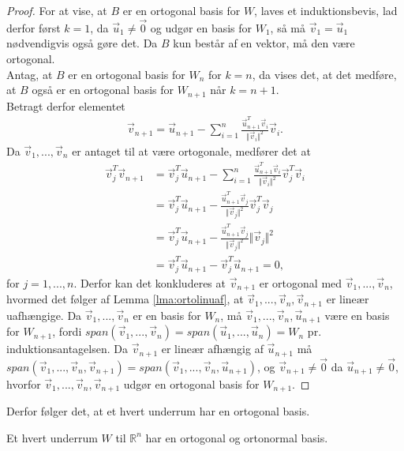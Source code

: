 \begin{proof}
For at  vise, at $B$ er en ortogonal basis for $W$, laves et induktionsbevis, lad derfor først $k= 1$, da $\vec{u}_1\neq \vec{0}$ og udgør en basis for $W_1$, så må $\vec{v}_1 = \vec{u}_1$ nødvendigvis også gøre det.
Da $B$ kun består af en vektor, må den være ortogonal.
\\Antag, at $B$ er en ortogonal basis for $W_n$ for $k=n$, da vises det, at det medføre, at $B$ også er en ortogonal basis for  $W_{n+1}$ når $k = n+1$.
\\Betragt derfor elementet 
\begin{align*}
\vec{v}_{n+1} = \vec{u}_{n+1} - \sum_{i=1}^n \frac{\vec{u}_{n+1}^T\vec{v}_i}{\Vert\vec{v}_i\Vert^2}\vec{v}_i.
\end{align*}
Da $\vec{v}_1,...,\vec{v}_n$ er antaget til at være ortogonale, medfører det at
\begin{align*}
\vec{v}_j^T\vec{v}_{n+1} &= \vec{v}_j^T\vec{u}_{n+1} - \sum_{i=1}^n \frac{\vec{u}_{n+1}^T\vec{v}_i}{\Vert\vec{v}_i\Vert^2}\vec{v}_j^T\vec{v}_i
\\ &= \vec{v}_j^T\vec{u}_{n+1} - \frac{\vec{u}_{n+1}^T\vec{v}_j}{\Vert\vec{v}_j\Vert^2}\vec{v}_j^T\vec{v}_j
\\ & = \vec{v}_j^T\vec{u}_{n+1} -  \frac{\vec{u}_{n+1}^T\vec{v}_j}{\Vert\vec{v}_j\Vert^2}\Vert\vec{v}_j\Vert^2
\\ & =\vec{v}_j^T\vec{u}_{n+1} - \vec{v}_j^T\vec{u}_{n+1} = 0 , 
\end{align*}
for $j = 1,...,n$. 
Derfor kan det konkluderes at $\vec{v}_{n+1}$ er ortogonal med $\vec{v}_1,...,\vec{v}_n$, hvormed det følger af Lemma \ref{lma:ortolinuaf}, at $\vec{v}_1,...,\vec{v}_n, \vec{v}_{n+1}$ er lineær uafhængige.
Da $\vec{v}_1,...,\vec{v}_n$ er en basis for $W_n$, må $\vec{v}_1,...,\vec{v}_n, \vec{u}_{n+1}$ være en basis for $W_{n+1}$, fordi $span(\vec{v}_1,...,\vec{v}_n) = span(\vec{u}_1,...,\vec{u}_n) = W_n$ pr. induktionsantagelsen. 
Da $\vec{v}_{n+1}$ er lineær afhængig af $\vec{u}_{n+1}$ må $span(\vec{v}_1,...,\vec{v}_n, \vec{v}_{n+1}) = span(\vec{v}_1,...,\vec{v}_n, \vec{u}_{n+1})$, og $\vec{v}_{n+1} \neq \vec{0}$ da $\vec{u}_{n+1} \neq \vec{0}$, hvorfor $\vec{v}_1,...,\vec{v}_n, \vec{v}_{n+1}$ udgør en ortogonal basis for $W_{n+1}$.
\end{proof}
Derfor følger det, at et hvert underrum har en ortogonal basis.
\begin{kor}
Et hvert underrum $W$ til $\mathds{R}^n$ har en ortogonal og ortonormal basis.
\end{kor}
